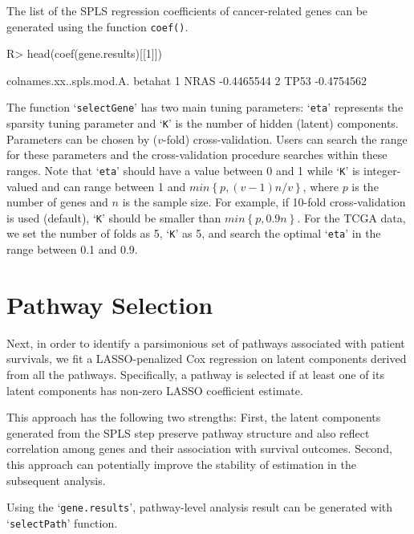 \documentclass[11pt]{article}
\begin{document}
The list of the SPLS regression coefficients of cancer-related genes can be generated using the function \texttt{coef()}.

\begin{Schunk}
\begin{Sinput}
R> head(coef(gene.results)[[1]])
\end{Sinput}
\begin{Soutput}
  colnames.xx..spls.mod.A.    betahat
1                     NRAS -0.4465544
2                     TP53 -0.4754562
\end{Soutput}
\end{Schunk}

The function `\texttt{selectGene}' has two main tuning parameters: `\texttt{eta}' represents the sparsity tuning parameter and `\texttt{K}' is the number of hidden (latent) components. Parameters can be chosen by ($v$-fold) cross-validation. Users can search the range for these parameters and the cross-validation procedure searches within these ranges. Note that `\texttt{eta}' should have a value between 0 and 1 while `\texttt{K}' is integer-valued and can range between
1 and $ min \left\{ p, (v-1) n / v \right\} $, where $p$ is the number of genes and $n$ is the sample size. For example, if 10-fold cross-validation is used (default), `\texttt{K}' should be smaller than $ min \left\{ p, 0.9 n \right\} $. For the TCGA data, we set the number of folds as 5, `\texttt{K}' as 5, and search  the optimal `\texttt{eta}' in the range between 0.1 and 0.9.

\section{Pathway Selection}

Next, in order to identify a parsimonious set of pathways associated with patient survivals, we fit a LASSO-penalized Cox regression \cite{LASSO} on latent components derived from all the pathways.
Specifically, a pathway is selected if at least one of its latent components has non-zero LASSO coefficient estimate.

This approach has the following two strengths:
First, the latent components generated from the SPLS step preserve pathway structure and also reflect correlation among genes and their association with survival outcomes. Second, this approach can potentially improve the stability of estimation in the subsequent analysis.

Using the `\texttt{gene.results}', pathway-level analysis result can be generated with `\texttt{selectPath}' function.
\end{document}
